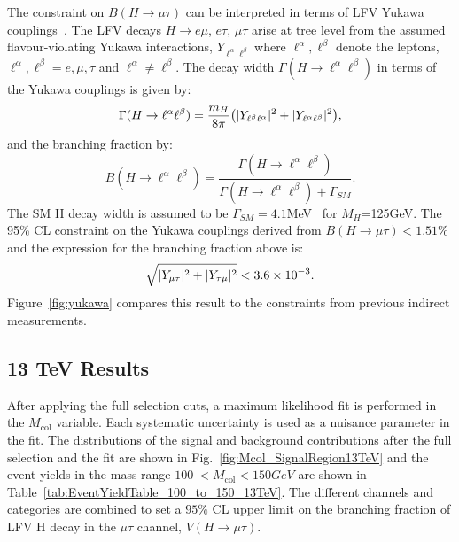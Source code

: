 \documentclass[oneside, letterpaper, oldfontcommands]{memoir}
\DeclarePairedDelimiter{\abs}{\lvert}{\rvert}
\begin{document}
The constraint on $B(H \rightarrow \mu \tau )$ can be interpreted in terms of LFV  Yukawa couplings~\cite{Harnik:2012pb}.
The LFV decays $H \rightarrow e\mu$, $e\tau$, $\mu\tau$ arise at tree level from the assumed
flavour-violating Yukawa interactions, $Y_{\ell^{\alpha}\ell^{\beta}}$ where $\ell^{\alpha},\ell^{\beta}$ denote the leptons, $\ell^{\alpha},\ell^{\beta}=e,\mu,\tau$ and $\ell^{\alpha}\neq \ell^{\beta}$.
The decay width $\Gamma(H \rightarrow \ell^{\alpha}\ell^{\beta})$  in terms of the Yukawa couplings is given by:
\begin{equation*}
\Gamma(H \rightarrow \ell^{\alpha}\ell^{\beta})=\frac{m_{H}}{8\pi}\bigl(\abs{Y_{\ell^{\beta}\ell^{\alpha}}}^2 + \abs{Y_{\ell^{\alpha}\ell^{\beta}}}^2\bigr),
\end{equation*}
and the branching fraction by:
\begin{equation*}
B(H \rightarrow \ell^{\alpha}\ell^{\beta})=\frac{\Gamma(H\rightarrow \ell^{\alpha}\ell^{\beta})}{\Gamma(H\rightarrow \ell^{\alpha}\ell^{\beta}) + \Gamma_{SM}}.
\end{equation*}
The SM H decay width is assumed to be $\Gamma_{SM}=4.1$MeV~\cite{Denner:2011mq} for $M_{H}$=125GeV.
The 95\% CL constraint on the Yukawa couplings derived from $B(H \rightarrow \mu \tau )<1.51\%$ and the expression for the branching fraction above is:\begin{equation*}
\sqrt{\abs{Y_{\mu\tau}}^{2}+\abs{Y_{\tau\mu}}^{2}}<3.6\times 10^{-3}.
\end{equation*}
Figure~\ref{fig:yukawa} compares this result to the constraints from previous indirect
measurements.
\subsection{13 TeV Results}
After applying the full selection cuts, a maximum likelihood fit is performed in the $M_\text{col}$ variable. Each systematic uncertainty is used as a nuisance parameter in the fit. The distributions of the signal and background contributions after the full selection and the fit are shown in Fig.~\ref{fig:Mcol_SignalRegion13TeV} and the
event yields in the mass range $100\:  < M_\text{col} < 150GeV$ are shown in Table~\ref{tab:EventYieldTable_100_to_150_13TeV}.
The different channels and categories are combined  to set a $95\%$ CL  upper limit on the branching
fraction of LFV H decay in the  $\mu\tau$ channel, $V(H\rightarrow\mu\tau)$.
\end{document}
